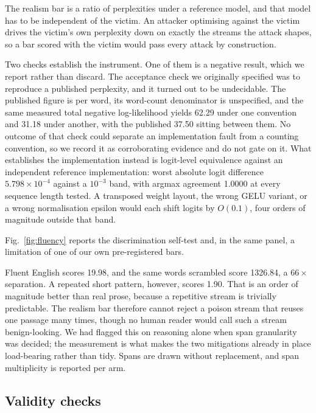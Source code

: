 \documentclass[journal]{IEEEtran}
\begin{document}
The realism bar is a ratio of perplexities under a reference model, and that
model has to be independent of the victim. An attacker optimising against the
victim drives the victim's own perplexity down on exactly the streams the attack
shapes, so a bar scored with the victim would pass every attack by construction.

Two checks establish the instrument. One of them is a negative result, which we
report rather than discard. The acceptance check we originally specified was to
reproduce a published perplexity, and it turned out to be undecidable. The
published figure is per word, its word-count denominator is unspecified, and the
same measured total negative log-likelihood yields 62.29 under one convention and
31.18 under another, with the published 37.50 sitting between them. No outcome of
that check could separate an implementation fault from a counting convention, so
we record it as corroborating evidence and do not gate on it. What establishes
the implementation instead is logit-level equivalence against an independent
reference implementation: worst absolute logit difference $5.798\times10^{-4}$
against a $10^{-3}$ band, with argmax agreement 1.0000 at every sequence length
tested. A transposed weight layout, the wrong GELU variant, or a wrong
normalisation epsilon would each shift logits by $O(0.1)$, four orders of
magnitude outside that band.

Fig.~\ref{fig:fluency} reports the discrimination self-test and, in the same
panel, a limitation of one of our own pre-registered bars.



Fluent English scores 19.98, and the same words scrambled score 1326.84, a
$66\times$ separation. A repeated short pattern, however, scores 1.90.
That is an order of magnitude better than real prose, because a repetitive stream
is trivially predictable. The realism bar therefore cannot reject a poison stream
that reuses one passage many times, though no human reader would call such a
stream benign-looking. We had flagged this on reasoning alone when span
granularity was decided; the measurement is what makes the two mitigations
already in place load-bearing rather than tidy. Spans are drawn without
replacement, and span multiplicity is reported per arm.

\subsection{Validity checks}
\label{sec:results}
\end{document}
